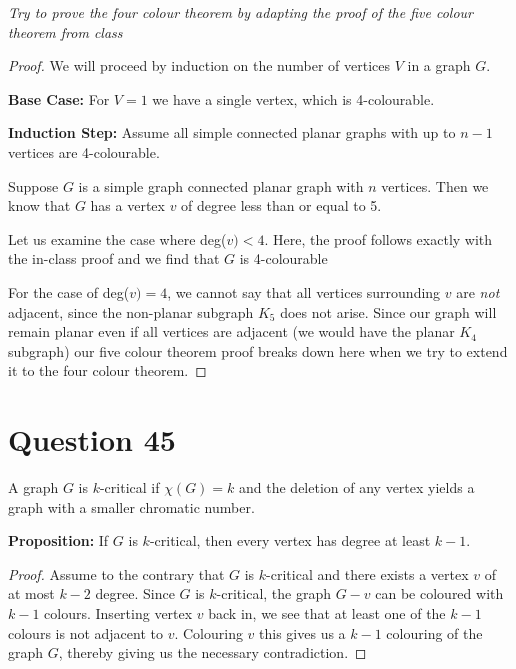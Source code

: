 \documentclass[11pt, oneside]{article}   	%
\begin{document}
\emph{Try to prove the four colour theorem by adapting the proof of the five colour theorem from class}

\begin{proof}
We will proceed by induction on the number of vertices $V$ in a graph $G$.

\textbf{Base Case:} For $V=1$ we have a single vertex, which is 4-colourable.

\textbf{Induction Step:} Assume all simple connected planar graphs with up to $n-1$ vertices are 4-colourable.

Suppose $G$ is a simple graph connected planar graph with $n$ vertices. Then we know that $G$ has a vertex $v$ of degree less than or equal to 5.

Let us examine the case where deg($v) < 4$. Here, the proof follows exactly with the in-class proof and we find that $G$ is 4-colourable

For the case of deg($v) =4$, we cannot say that all vertices surrounding $v$ are \textit{not} adjacent, since the non-planar subgraph $K_5$ does not arise. Since our graph will remain planar even if all vertices are adjacent (we would have the planar $K_4$ subgraph) our five colour theorem proof breaks down here when we try to extend it to the four colour theorem.
\end{proof}

\section*{Question 45}

A graph $G$ is $k$-critical if $\chi(G)=k$ and the deletion of any vertex yields a graph with a smaller chromatic number. 

\textbf{Proposition:} If $G$ is $k$-critical, then every vertex has degree at least $k-1$.

\begin{proof}
Assume to the contrary that $G$ is $k$-critical and there exists a vertex $v$ of at most $k-2$ degree. Since $G$ is $k$-critical, the graph $G-v$ can be coloured with $k-1$ colours. Inserting vertex $v$ back in, we see that at least one of the $k-1$ colours is not adjacent to $v$. Colouring $v$ this gives us a $k-1$ colouring of the graph $G$, thereby giving us the necessary contradiction.




\end{proof}
\end{document}
